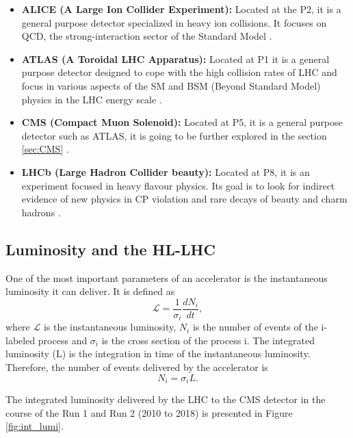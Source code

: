 \begin{itemize}
    \item \textbf{ALICE (A Large Ion Collider Experiment):} Located at the P2, it is a general purpose detector specialized in heavy ion collisions. It focuses on QCD, the strong-interaction sector of the Standard Model \cite{ALICE:2008ngc}.
    \item \textbf{ATLAS (A Toroidal LHC Apparatus):} Located at P1 it is a general purpose detector designed to cope with the high collision rates of LHC and focus in various aspects of the SM and BSM (Beyond Standard Model) physics in the LHC energy scale \cite{ATLAS:2008xda}.
    \item \textbf{CMS (Compact Muon Solenoid):} Located at P5, it is a general purpose detector such as ATLAS, it is going to be further explored in the section \ref{sec:CMS} \cite{CMS:2008xjf}.
    \item \textbf{LHCb (Large Hadron Collider beauty):} Located at P8, it is an experiment focused in heavy flavour physics. Its goal is to look for indirect evidence of new physics in CP violation and rare decays of beauty and charm hadrons \cite{LHCb:2008vvz}.
\end{itemize}

\subsection{Luminosity and the HL-LHC}

One of the most important parameters of an accelerator is the instantaneous luminosity it can deliver. It is defined as
\begin{equation}
    \mathcal{L} = \frac{1}{\sigma_i} \frac{dN_i}{dt},
\end{equation}
where $\mathcal{L}$ is the instantaneous luminosity, $N_i$ is the number of events of the i-labeled process and $\sigma_i$ is the cross section of the process i. The integrated luminosity (L) is the integration in time of the instantaneous luminosity. Therefore, the number of events delivered by the accelerator is
\begin{equation}
    N_i = \sigma_i L.
\end{equation}

The integrated luminosity delivered by the LHC to the CMS detector in the course of the Run 1 and Run 2 (2010 to 2018) is presented in Figure \ref{fig:int_lumi}.

